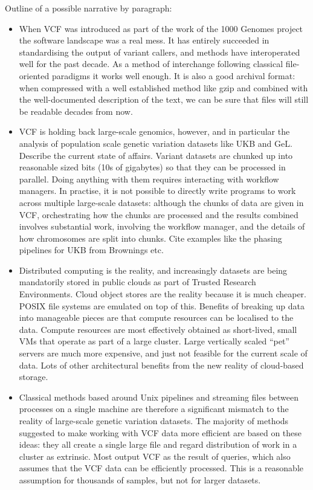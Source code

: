 \documentclass[a4paper,num-refs]{oup-contemporary}
\begin{document}
Outline of a possible narrative by paragraph:
\begin{itemize}
\item When VCF was introduced as part of the work of the 1000 Genomes
project the software landscape was a real mess. It has entirely
succeeded in standardising the output of variant callers, and methods
have interoperated well for the past decade. As a method of interchange
following classical file-oriented paradigms it works well enough.
It is also a good archival format: when compressed with a well established
method like gzip and combined with the well-documented description of
the text, we can be sure that files will still be readable decades
from now.

\item VCF is holding back large-scale genomics, however, and in particular the
analysis of population scale genetic variation datasets like UKB and GeL.
Describe the current state of affairs. Variant datasets are chunked up
into reasonable sized bits (10s of gigabytes) so that they can be processed
in parallel. Doing anything with them requires interacting with workflow
managers. In practise, it is not possible to directly write programs to
work across multiple large-scale datasets: although the chunks of data
are given in VCF, orchestrating how the chunks are processed and
the results combined involves substantial work, involving the workflow
manager, and the details of how chromosomes are split into chunks.
Cite examples like the phasing pipelines for UKB from Brownings etc.

\item Distributed computing is the reality, and increasingly datasets
are being mandatorily stored in public clouds as part of
Trusted Research Environments. Cloud object stores are the reality
because it is much cheaper. POSIX file systems are emulated on top of
this. Benefits of breaking up data into manageable pieces are that
compute resources can be localised to the data. Compute resources are
most effectively obtained as short-lived, small VMs that operate
as part of a large cluster. Large vertically scaled ``pet'' servers
are much more expensive, and just not feasible for the current
scale of data. Lots of other architectural
benefits from the new reality of cloud-based storage.

\item Classical methods based around Unix pipelines and streaming
files between processes on a single machine are therefore a
significant mismatch to the reality of large-scale genetic variation
datasets. The majority of methods suggested to make working
with VCF data more efficient are based on these ideas: they all
create a single large file and regard distribution of work
in a cluster as extrinsic. Most output VCF as the result of queries,
which also assumes that the VCF data can be efficiently processed.
This is a reasonable assumption for thousands of samples, but not
for larger datasets.


\end{itemize}
\end{document}
